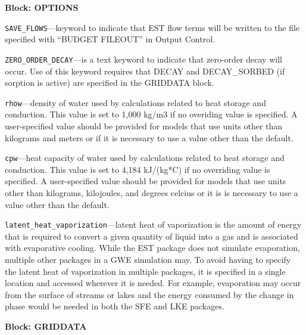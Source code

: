 
\item \textbf{Block: OPTIONS}

\begin{description}
\item \texttt{SAVE\_FLOWS}---keyword to indicate that EST flow terms will be written to the file specified with ``BUDGET FILEOUT'' in Output Control.

\item \texttt{ZERO\_ORDER\_DECAY}---is a text keyword to indicate that zero-order decay will occur.  Use of this keyword requires that DECAY and DECAY\_SORBED (if sorption is active) are specified in the GRIDDATA block.

\item \texttt{rhow}---density of water used by calculations related to heat storage and conduction.  This value is set to 1,000 kg/m3 if no overiding value is specified.  A user-specified value should be provided for models that use units other than kilograms and meters or if it is necessary to use a value other than the default.

\item \texttt{cpw}---heat capacity of water used by calculations related to heat storage and conduction.  This value is set to 4,184 kJ/(kg*C) if no overriding value is specified.  A user-specified value should be provided for models that use units other than kilograms, kilojoules, and degrees celcius or it is is necessary to use a value other than the default.

\item \texttt{latent\_heat\_vaporization}---latent heat of vaporization is the amount of energy that is required to convert a given quantity of liquid into a gas and is associated with evaporative cooling.  While the EST package does not simulate evaporation, multiple other packages in a GWE simulation may.  To avoid having to specify the latent heat of vaporization in multiple packages, it is specified in a single location and accessed wherever it is needed.  For example, evaporation may occur from the surface of streams or lakes and the energy consumed by the change in phase would be needed in both the SFE and LKE packages.

\end{description}
\item \textbf{Block: GRIDDATA}

